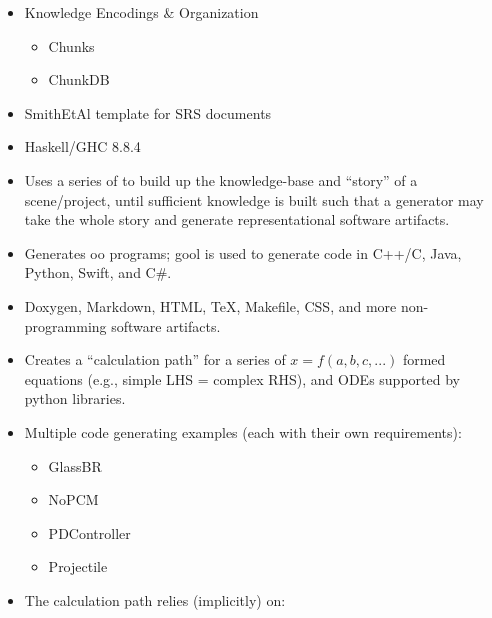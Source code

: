 \begin{itemize}

      \item Knowledge Encodings \& Organization
            \begin{itemize}
                  \item Chunks
                  \item ChunkDB
            \end{itemize}

      \item SmithEtAl template for SRS documents

      \item Haskell/GHC 8.8.4

      \item Uses a series of  to build up the knowledge-base and
            ``story'' of a scene/project, until sufficient knowledge is built
            such that a generator may take the whole story and generate
            representational software artifacts.

      \item Generates \acs{oo} programs; \acs{gool} is used to generate code in
            C++/C, Java, Python, Swift, and C\#.

      \item Doxygen, Markdown, HTML, TeX, Makefile, CSS, and more
            non-programming software artifacts.

      \item Creates a ``calculation path'' for a series of $x = f(a,b,c,...)$
            formed equations (e.g., simple LHS = complex RHS), and ODEs
            supported by python libraries.

      \item Multiple code generating examples (each with their own
            requirements):
            \begin{itemize}
                  \item GlassBR
                  \item NoPCM
                  \item PDController
                  \item Projectile
            \end{itemize}

      \item The calculation path relies (implicitly) on:
            \begin{itemize}


\end{itemize}
\end{itemize}
